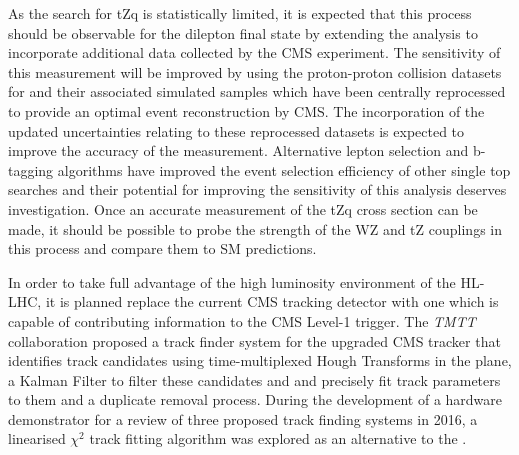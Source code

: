 
As the search for tZq is statistically limited, it is expected that this process should be observable for the dilepton final state by extending the analysis to incorporate additional data collected by the CMS experiment.
The sensitivity of this measurement will be improved by using the proton-proton collision datasets for and their associated simulated samples which have been centrally reprocessed to provide an optimal event reconstruction by CMS.
The incorporation of the updated uncertainties relating to these reprocessed datasets is  expected to improve the accuracy of the measurement.
Alternative lepton selection and b-tagging algorithms have improved the event selection efficiency of other single top searches and their potential for improving the sensitivity of this analysis deserves investigation.
Once an accurate measurement of the tZq cross section can be made, it should be possible to probe  the strength of the WZ and tZ couplings in this process and compare them to SM predictions.

%

In order to take full advantage of the high luminosity environment of the HL-LHC, it is planned replace the current CMS tracking detector with one which is capable of contributing information to the CMS Level-1 trigger.
The \emph{TMTT} collaboration proposed a track finder system for the upgraded CMS tracker that identifies track candidates using time-multiplexed Hough Transforms in the \rphi plane, a Kalman Filter to filter these candidates and and precisely fit track parameters to them and a duplicate removal process.
During the development of a hardware demonstrator for a review of three proposed track finding systems in 2016, a linearised $\chi^{2}$ track fitting algorithm was explored as an alternative to the \KF.


